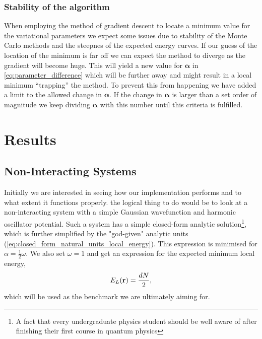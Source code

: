 \documentclass[
    a4paper, aps, twocolumn, floatfix, superscriptaddress, nofootinbib]{revtex4-1}
\newcommand{\vfg}{\boldsymbol}
\newcommand{\1}{\mathds{1}}
\begin{document}
            \subsubsection{Stability of the algorithm}
                When employing the method of gradient descent to locate a
                minimum value for the variational parameters we expect some
                issues due to stability of the Monte Carlo methods and the
                steepnes of the expected energy curves. If our guess of the
                location of the minimum is far off we can expect the method to
                diverge as the gradient will become huge. This will yield a
                new value for $\vfg{\alpha}$ in
                \autoref{eq:parameter_difference} which will be further away and
                might result in a local minimum ``trapping'' the method. To
                prevent this from happening we have added a limit to the allowed
                change in $\vfg{\alpha}$. If the change in $\vfg{\alpha}$ is
                larger than a set order of magnitude we keep dividing
                $\vfg{\alpha}$ with this number until this criteria is
                fulfilled.


\section{Results}

    \subsection{Non-Interacting Systems}
        Initially we are interested in seeing how our implementation performs
        and to what extent it functions properly.  the logical thing to do would
        be to look at a non-interacting system with a simple Gaussian
        wavefunction and harmonic oscillator potential. Such a system has a
        simple closed-form analytic solution\footnote{A fact that every
        undergraduate physics student should be well aware of after finishing
        their first course in quantum physics}, which is further simplified by
        the "god-given" analytic units
        (\autoref{eq:closed_form_natural_units_local_energy}). This expression
        is minimised for $\alpha = \frac{1}{2}\omega$. We also set $\omega = 1$
        and get an expression for the expected minimum local energy,
        \begin{equation}
            E_L(\vb{r}) = \frac{dN}{2},
        \end{equation}
        which will be used as the benchmark we are ultimately aiming for.
\end{document}
